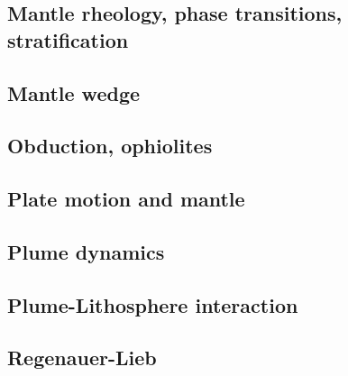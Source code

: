 \subsection*{Mantle rheology, phase transitions, stratification}

\cite{yusb82}
\cite{zhyh92}
\cite{tasg93}
\cite{zhyu95}
\cite{pazw07}
\cite{java11}
\cite{tack12}

\subsection*{Mantle wedge}

\cite{tosl78}
\cite{leki09}
\cite{roms10}
\cite{ledg14}

\subsection*{Obduction, ophiolites}

\cite{hack90}
\cite{hack91}
\cite{agzf14}

\subsection*{Plate motion and mantle}

\cite{zieg92a}
\cite{zhgm98}
\cite{lizh09}
\cite{huss12}
\cite{yoha15}

\subsection*{Plume dynamics}

\cite{nasf94}\cite{hayu94}
\cite{lays99}
\cite{isst06}
\cite{toyu11}\cite{talz11}
\cite{dagm13}
\cite{daso15}
\cite{dacc18}

\subsection*{Plume-Lithosphere interaction}

\cite{rich94}

\subsection*{Regenauer-Lieb}

